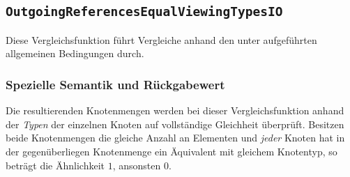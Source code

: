 \newpage
%
%
\subsection{\texttt{OutgoingReferencesEqualViewingTypesIO}}
Diese Vergleichsfunktion führt Vergleiche anhand den unter\mylinebreak{} aufgeführten allgemeinen Bedingungen durch.

\subsubsection*{Spezielle Semantik und Rückgabewert}
Die resultierenden Knotenmengen werden bei dieser Vergleichsfunktion anhand der \emph{Typen} der einzelnen Knoten auf vollständige Gleichheit überprüft. Besitzen beide Knotenmengen die gleiche Anzahl an Elementen und \emph{jeder} Knoten hat in der gegenüberliegen Knotenmenge ein Äquivalent mit gleichem Knotentyp, so beträgt die Ähnlichkeit $1$, ansonsten $0$.
